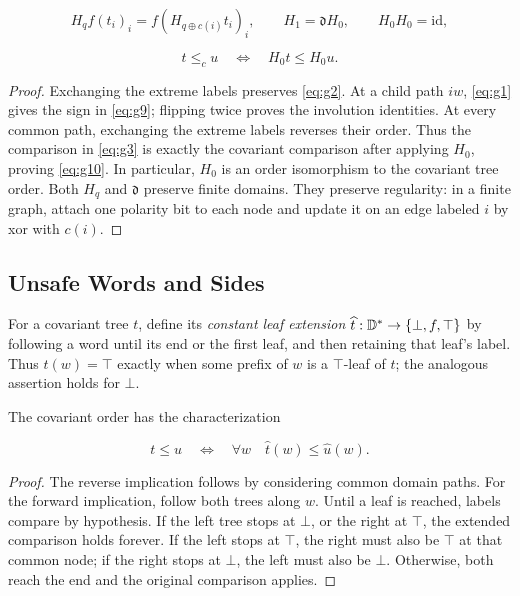 \begin{lemma}[Normalization]\label{lem:normalization}
\begin{equation}\label{eq:g9}
H_q f(t_i)_i=f(H_{q\oplus c(i)}t_i)_i,\qquad
 H_1=\mathfrak d H_0,\qquad H_0H_0=\mathrm{id},
\end{equation}

\begin{equation}\label{eq:g10}
t\le_c u\quad\Longleftrightarrow\quad H_0t\le H_0u.
\end{equation}

\end{lemma}
\begin{proof} Exchanging the extreme labels preserves \eqref{eq:g2}. At a child path $iw$, \eqref{eq:g1} gives
the sign in \eqref{eq:g9}; flipping twice proves the involution identities.
At every common path, exchanging the extreme labels reverses their order. Thus the comparison in
\eqref{eq:g3} is exactly the covariant comparison after applying $H_0$, proving \eqref{eq:g10}.
In particular, $H_0$ is an order isomorphism to the covariant tree order.
Both $H_q$ and $\mathfrak d$ preserve finite domains. They preserve regularity:
in a finite graph, attach one polarity bit to each node and update it on an
edge labeled $i$ by xor with $c(i)$. \end{proof}

\subsection{Unsafe Words and Sides}\label{sec:unsafe}
For a covariant tree $t$, define its \emph{constant leaf extension}
$\widehat t:\mathbb{D}^*\to\{\bot,f,\top\}$ by following a word until its
end or the first leaf, and then retaining that leaf's label. Thus
$\widehat t(w)=\top$ exactly when some prefix of $w$ is a $\top$-leaf
of $t$; the analogous assertion holds for $\bot$.

\begin{lemma}\label{lem:leaf-extension}
The covariant order has the characterization

\begin{equation}\label{eq:g11}
t\le u\quad\Longleftrightarrow\quad
 \forall w\quad\widehat t(w)\le\widehat u(w).
\end{equation}

\end{lemma}
\begin{proof} The reverse implication follows by considering common domain
paths. For the forward implication, follow both trees along $w$. Until a
leaf is reached, labels compare by hypothesis. If the left tree stops at
$\bot$, or the right at $\top$, the extended comparison holds forever.
If the left stops at $\top$, the right must also be $\top$ at that common
node; if the right stops at $\bot$, the left must also be $\bot$.
Otherwise, both reach the end and the original comparison applies. \end{proof}

